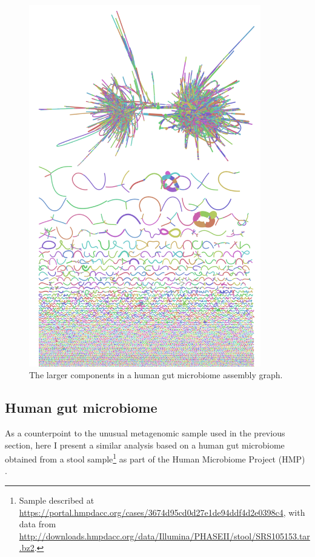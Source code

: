 \begin{figure}[htbp!]
  \centering
  \includegraphics[width=0.9\textwidth]{Chapter3/Figs/SRS105153_k51a3_contigs_gfa.png}
  \caption{
    The larger components in a human gut microbiome assembly graph.
  }
  \label{fig:human_gut_microbiome_bandage}
\end{figure}

\subsection{Human gut microbiome}

As a counterpoint to the unusual metagenomic sample used in the previous section, here I present a similar analysis based on a human gut microbiome obtained from a stool sample\footnote{Sample described at \url{https://portal.hmpdacc.org/cases/3674d95cd0d27e1de94ddf4d2e0398c4}, with data from \url{http://downloads.hmpdacc.org/data/Illumina/PHASEII/stool/SRS105153.tar.bz2}.} as part of the Human Microbiome Project (HMP) \cite{turnbaugh2007human,peterson2009nih}.

